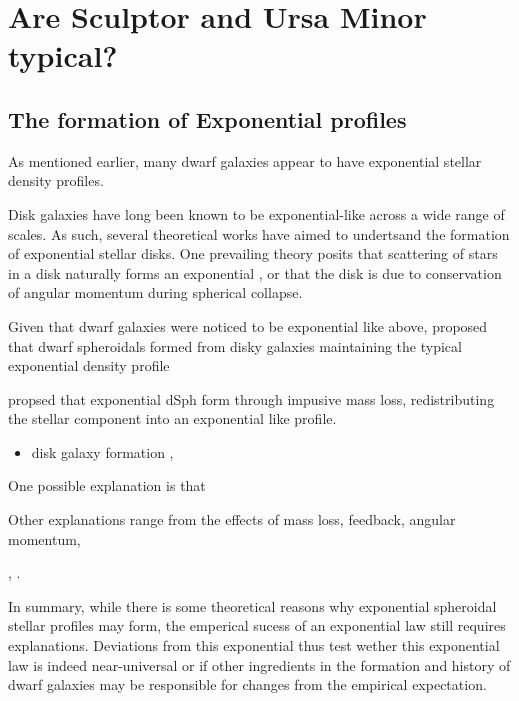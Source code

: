 \section{Are Sculptor and Ursa Minor
typical?}\label{are-sculptor-and-ursa-minor-typical}

\subsection{The formation of Exponential
profiles}\label{the-formation-of-exponential-profiles}

As mentioned earlier, many dwarf galaxies appear to have exponential
stellar density profiles.

Disk galaxies have long been known to be exponential-like across a wide
range of scales. As such, several theoretical works have aimed to
undertsand the formation of exponential stellar disks. One prevailing
theory posits that scattering of stars in a disk naturally forms an
exponential \citep[\citet{wu+2022}]{elmegreen+struck2013}, or that the
disk is due to conservation of angular momentum during spherical
collapse.

Given that dwarf galaxies were noticed to be exponential like above,
\citet{faber+lin1983} proposed that dwarf spheroidals formed from disky
galaxies maintaining the typical exponential density profile

\citet{reed+gilmore2005} propsed that exponential dSph form through
impusive mass loss, redistributing the stellar component into an
exponential like profile.

\begin{itemize}
\tightlist
\item
  disk galaxy formation \citet{fall+efstathiou1980}, \citet{mestel1963}
\end{itemize}

One possible explanation is that \citet{mayer+2001a}

Other explanations range from the effects of mass loss, feedback,
angular momentum,

\citet{klimentowski2007}, \citet{klimentowski2009}.

In summary, while there is some theoretical reasons why exponential
spheroidal stellar profiles may form, the emperical sucess of an
exponential law still requires explanations. Deviations from this
exponential thus test wether this exponential law is indeed
near-universal or if other ingredients in the formation and history of
dwarf galaxies may be responsible for changes from the empirical
expectation.

